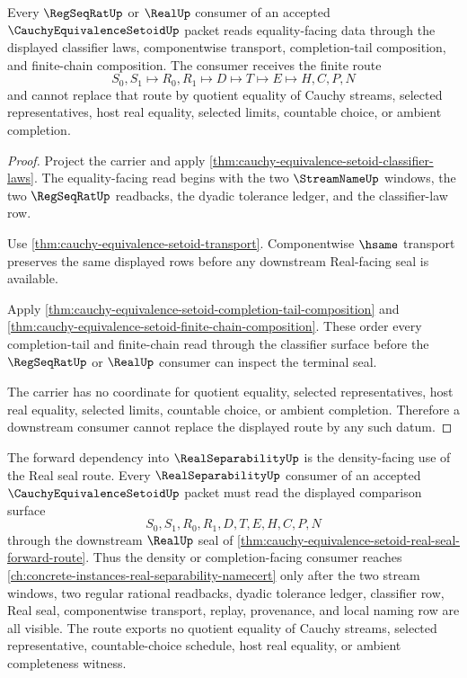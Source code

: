 \begin{theorem}
\label{thm:cauchy-equivalence-setoid-no-quotient}
Every $\RegSeqRatUp$ or $\RealUp$ consumer of an accepted $\CauchyEquivalenceSetoidUp$ packet reads equality-facing data through the displayed classifier laws, componentwise transport, completion-tail composition, and finite-chain composition. The consumer receives the finite route
$$
S_0,S_1 \longmapsto R_0,R_1 \longmapsto D \longmapsto T \longmapsto E \longmapsto H,C,P,N
$$
and cannot replace that route by quotient equality of Cauchy streams, selected representatives, host real equality, selected limits, countable choice, or ambient completion.
\end{theorem}
\begin{proof}
Project the carrier and apply \autoref{thm:cauchy-equivalence-setoid-classifier-laws}. The equality-facing read begins with the two $\StreamNameUp$ windows, the two $\RegSeqRatUp$ readbacks, the dyadic tolerance ledger, and the classifier-law row.

Use \autoref{thm:cauchy-equivalence-setoid-transport}. Componentwise $\hsame$ transport preserves the same displayed rows before any downstream Real-facing seal is available.

Apply \autoref{thm:cauchy-equivalence-setoid-completion-tail-composition} and \autoref{thm:cauchy-equivalence-setoid-finite-chain-composition}. These order every completion-tail and finite-chain read through the classifier surface before the $\RegSeqRatUp$ or $\RealUp$ consumer can inspect the terminal seal.

The carrier has no coordinate for quotient equality, selected representatives, host real equality, selected limits, countable choice, or ambient completion. Therefore a downstream consumer cannot replace the displayed route by any such datum.
\end{proof}

The forward dependency into $\RealSeparabilityUp$ is the density-facing use of the Real seal route. Every $\RealSeparabilityUp$ consumer of an accepted $\CauchyEquivalenceSetoidUp$ packet must read the displayed comparison surface
$$
S_0,S_1,R_0,R_1,D,T,E,H,C,P,N
$$
through the downstream $\RealUp$ seal of \autoref{thm:cauchy-equivalence-setoid-real-seal-forward-route}. Thus the density or completion-facing consumer reaches \autoref{ch:concrete-instances-real-separability-namecert} only after the two stream windows, two regular rational readbacks, dyadic tolerance ledger, classifier row, Real seal, componentwise transport, replay, provenance, and local naming row are all visible. The route exports no quotient equality of Cauchy streams, selected representative, countable-choice schedule, host real equality, or ambient completeness witness.

